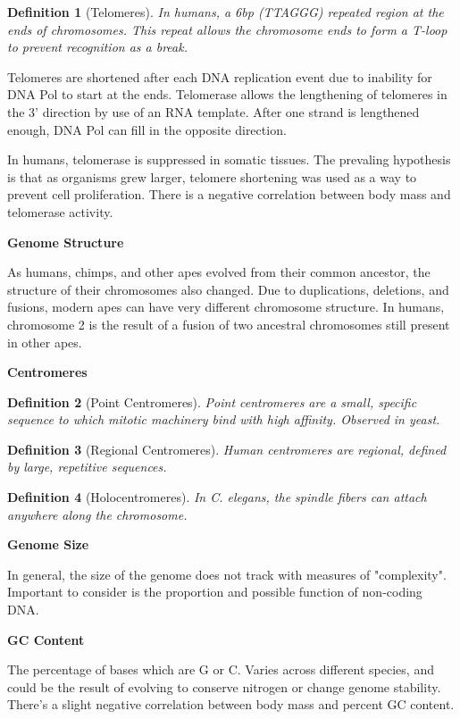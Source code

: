 \documentclass{tufte-handout}
\theoremstyle{noparens}
\newtheorem*{define}{Definition}
\begin{document}
\begin{define}[Telomeres]
In humans, a 6bp (TTAGGG) repeated region at the ends of chromosomes. This repeat allows the chromosome ends to form a T-loop to prevent recognition as a break.
\end{define}

Telomeres are shortened after each DNA replication event due to inability for DNA Pol to start at the ends. Telomerase allows the lengthening of telomeres in the 3' direction by use of an RNA template. After one strand is lengthened enough, DNA Pol can fill in the opposite direction.

In humans, telomerase is suppressed in somatic tissues. The prevaling hypothesis is that as organisms grew larger, telomere shortening was used as a way to prevent cell proliferation. There is a negative correlation between body mass and telomerase activity.

\textbf{Genome Structure}

As humans, chimps, and other apes evolved from their common ancestor, the structure of their chromosomes also changed. Due to duplications, deletions, and fusions, modern apes can have very different chromosome structure. In humans, chromosome 2 is the result of a fusion of two ancestral chromosomes still present in other apes.

\textbf{Centromeres}

\begin{define}[Point Centromeres]
Point centromeres are a small, specific sequence to which mitotic machinery bind with high affinity. Observed in yeast.
\end{define}

\begin{define}[Regional Centromeres]
Human centromeres are regional, defined by large, repetitive sequences.
\end{define}

\begin{define}[Holocentromeres]
In \emph{C. elegans}, the spindle fibers can attach anywhere along the chromosome.
\end{define}

\textbf{Genome Size}

In general, the size of the genome does not track with measures of "complexity". Important to consider is the proportion and possible function of non-coding DNA.

\textbf{GC Content}

The percentage of bases which are G or C. Varies across different species, and could be the result of evolving to conserve nitrogen or change genome stability. There's a slight negative correlation between body mass and percent GC content.
\end{document}
